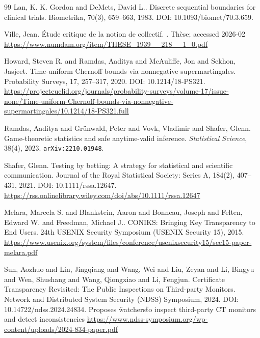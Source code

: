 \documentclass[11pt]{article}
\begin{document}
\begin{thebibliography}{99}
Lan, K. K. Gordon and DeMets, David L..
\newblock Discrete sequential boundaries for clinical trials.
\newblock Biometrika, 70(3), 659--663, 1983.
\newblock DOI: 10.1093/biomet/70.3.659.

Ville, Jean.
\newblock \'{E}tude critique de la notion de collectif.
.
\newblock Th\`ese; accessed 2026-02
\newblock \url{https://www.numdam.org/item/THESE_1939__218__1_0.pdf}

Howard, Steven R. and Ramdas, Aaditya and McAuliffe, Jon and Sekhon, Jasjeet.
\newblock Time-uniform Chernoff bounds via nonnegative supermartingales.
\newblock Probability Surveys, 17, 257--317, 2020.
\newblock DOI: 10.1214/18-PS321.
\newblock \url{https://projecteuclid.org/journals/probability-surveys/volume-17/issue-none/Time-uniform-Chernoff-bounds-via-nonnegative-supermartingales/10.1214/18-PS321.full}


Ramdas, Aaditya and Gr\"unwald, Peter and Vovk, Vladimir and Shafer, Glenn.
\newblock Game-theoretic statistics and safe anytime-valid inference.
\newblock \emph{Statistical Science}, 38(4), 2023.
\newblock \texttt{arXiv:2210.01948}.

Shafer, Glenn.
\newblock Testing by betting: A strategy for statistical and scientific communication.
\newblock Journal of the Royal Statistical Society: Series A, 184(2), 407--431, 2021.
\newblock DOI: 10.1111/rssa.12647.
\newblock \url{https://rss.onlinelibrary.wiley.com/doi/abs/10.1111/rssa.12647}

Melara, Marcela S. and Blankstein, Aaron and Bonneau, Joseph and Felten, Edward W. and Freedman, Michael J..
\newblock CONIKS: Bringing Key Transparency to End Users.
\newblock 24th USENIX Security Symposium (USENIX Security 15), 2015.
\newblock \url{https://www.usenix.org/system/files/conference/usenixsecurity15/sec15-paper-melara.pdf}

Sun, Aozhuo and Lin, Jingqiang and Wang, Wei and Liu, Zeyan and Li, Bingyu and Wen, Shushang and Wang, Qiongxiao and Li, Fengjun.
\newblock Certificate Transparency Revisited: The Public Inspections on Third-party Monitors.
\newblock Network and Distributed System Security (NDSS) Symposium, 2024.
\newblock DOI: 10.14722/ndss.2024.24834.
\newblock Proposes \"watchers\" to inspect third-party CT monitors and detect inconsistencies
\newblock \url{https://www.ndss-symposium.org/wp-content/uploads/2024-834-paper.pdf}


\end{thebibliography}
\end{document}
